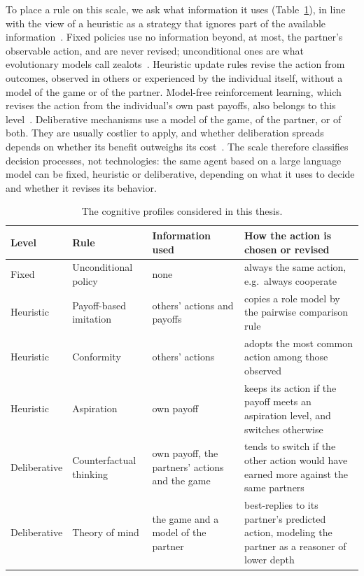 To place a rule on this scale, we ask what information it uses (Table~\ref{tab:profiles}), in line with the view of a heuristic as a strategy that ignores part of the available information~\cite{Gigerenzer2011}. Fixed policies use no information beyond, at most, the partner's observable action, and are never revised; unconditional ones are what evolutionary models call zealots~\cite{Masuda2012}. Heuristic update rules revise the action from outcomes, observed in others or experienced by the individual itself, without a model of the game or of the partner. Model-free reinforcement learning, which revises the action from the individual's own past payoffs, also belongs to this level~\cite{guoEngineeringOptimalCooperation2024, quanHumanMachineCooperation2026}. Deliberative mechanisms use a model of the game, of the partner, or of both. They are usually costlier to apply, and whether deliberation spreads depends on whether its benefit outweighs its cost~\cite{Bear2016}. The scale therefore classifies decision processes, not technologies: the same agent based on a large language model can be fixed, heuristic or deliberative, depending on what it uses to decide and whether it revises its behavior.

\begin{table}[htbp]
\centering
\small
\caption{The cognitive profiles considered in this thesis.}
\label{tab:profiles}
\begin{tabularx}{\textwidth}{@{}>{\raggedright\arraybackslash}p{}>{\raggedright\arraybackslash}p{}>{\raggedright\arraybackslash}p{}>{\raggedright\arraybackslash}X@{}}
\toprule
Level & Rule & Information used & How the action is chosen or revised \\
\midrule
Fixed & Unconditional policy & none & always the same action, e.g.\ always cooperate \\
Heuristic & Payoff-based imitation & others' actions and payoffs & copies a role model by the pairwise comparison rule \\
Heuristic & Conformity & others' actions & adopts the most common action among those observed~\cite{szolnokiConformityEnhancesNetwork2015} \\
Heuristic & Aspiration & own payoff & keeps its action if the payoff meets an aspiration level, and switches otherwise~\cite{duAspirationDynamicsMultiplayer2014} \\
Deliberative & Counterfactual thinking & own payoff, the partners' actions and the game & tends to switch if the other action would have earned more against the same partners~\cite{pereiraCounterfactualThinkingCooperation2019, coutoIntrospectionDynamicsSimple2022} \\
Deliberative & Theory of mind & the game and a model of the partner & best-replies to its partner's predicted action, modeling the partner as a reasoner of lower depth~\cite{Camerer2004, yoshidaGameTheoryMind2008} \\
\bottomrule
\end{tabularx}
\end{table}

